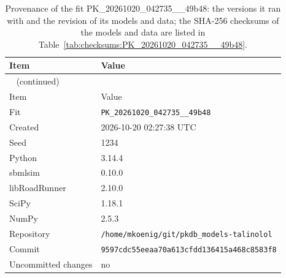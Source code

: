 \documentclass{article}
\begin{document}
\begin{longtable}{ll}
\caption{Provenance of the fit PK\_20261020\_042735\_\_49b48: the versions it ran with and the revision of its models and data; the SHA-256 checksums of the models and data are listed in Table~\ref{tab:checksums:PK_20261020_042735__49b48}.}\label{tab:provenance:PK_20261020_042735__49b48} \\
\toprule
Item & Value \\
\midrule
\endfirsthead
\multicolumn{2}{l}{\small\tablename~\thetable{} (continued)} \\
\toprule
Item & Value \\
\midrule
\endhead
\bottomrule
\endlastfoot
Fit & \texttt{PK\_20261020\_042735\_\_49b48} \\
Created & 2026-10-20 02:27:38 UTC \\
Seed & 1234 \\
Python & 3.14.4 \\
sbmlsim & 0.10.0 \\
libRoadRunner & 2.10.0 \\
SciPy & 1.18.1 \\
NumPy & 2.5.3 \\
Repository & \texttt{/home/mkoenig/git/pkdb\_models-talinolol} \\
Commit & \texttt{9597cdc55eeaa70a613cfdd136415a468c8583f8} \\
Uncommitted changes & no \\
\end{longtable}



\end{document}
